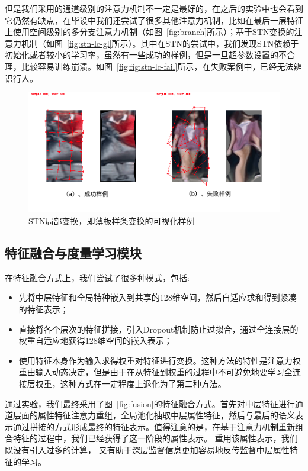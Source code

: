 但是我们采用的通道级别的注意力机制不一定是最好的，在之后的实验中也会看到它仍然有缺点，在毕设中我们还尝试了很多其他注意力机制，比如在最后一层特征上使用空间级别的多分支注意力机制（如图~\ref{fig:branch}所示）；基于STN变换的注意力机制（如图~\ref{fig:stn-lc-gl}所示）。其中在STN的尝试中，我们发现STN依赖于初始化或者较小的学习率，虽然有一些成功的样例，但是一旦超参数设置的不合理，比较容易训练崩溃。如图~\ref{fig:fig:stn-lc-fail}所示，在失败案例中，已经无法辨识行人。

\begin{figure}
	\centering
	\includegraphics[width=\textwidth]{fig/2018-05-19-23-06-12.png}
	\caption{STN局部变换，即薄板样条变换的可视化样例} \label{fig:stn-lc-fail}
\end{figure}

\subsection{特征融合与度量学习模块}

在特征融合方式上，我们尝试了很多种模式，包括:
\begin{itemize}
	\item 先将中层特征和全局特种嵌入到共享的128维空间，然后自适应求和得到紧凑的特征表示；
	\item 直接将各个层次的特征拼接，引入Dropout机制防止过拟合，通过全连接层的权重自适应地获得128维空间的嵌入表示；
	\item 使用特征本身作为输入求得权重对特征进行变换。这种方法的特性是注意力权重由输入动态决定，但是由于在从特征到权重的过程中不可避免地要学习全连接层权重，这种方式在一定程度上退化为了第二种方法。
\end{itemize}

通过实验，我们最终采用了图~\ref{fig:fusion}的特征融合方式。首先对中层特征进行通道层面的属性特征注意力重组，全局池化抽取中层属性特征，然后与最后的语义表示通过拼接的方式形成最终的特征表示。值得注意的是，在基于注意力机制重新组合特征的过程中，我们已经获得了这一阶段的属性表示。
重用该属性表示，我们既没有引入过多的计算，
又有助于深层监督信息更加容易地反传监督中层属性特征的学习。

